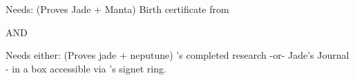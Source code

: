 \documentclass[green]{NeptuneBall}
\begin{document}
\name{\gLineage{}}


Needs:  (Proves Jade + Manta)
Birth certificate from \cDiplomat{}


AND

Needs either: (Proves jade + neputune)
\cSpy{}'s completed research
-or-
Jade's Journal - in a box accessible via \cPrince{}'s signet ring.
\end{document}
